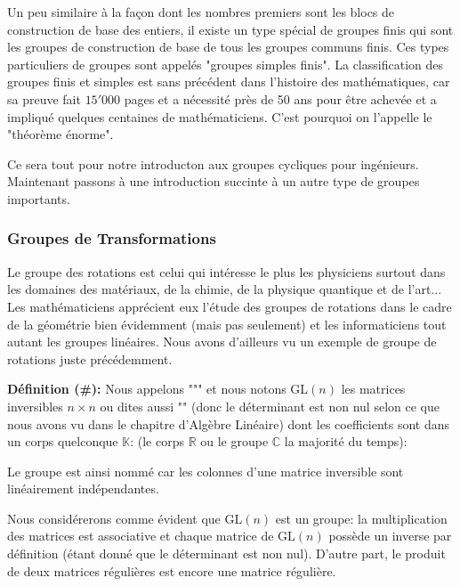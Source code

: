 	\begin{tcolorbox}[title=Remarque,colframe=black,arc=10pt]
	Un peu similaire à la façon dont les nombres premiers sont les blocs de construction de base des entiers, il existe un type spécial de groupes finis qui sont les groupes de construction de base de tous les groupes communs finis. Ces types particuliers de groupes sont appelés "groupes simples finis". La classification des groupes finis et simples est sans précédent dans l'histoire des mathématiques, car sa preuve fait $15'000$ pages et a nécessité près de 50 ans pour être achevée et a impliqué quelques centaines de mathématiciens. C'est pourquoi on l'appelle le "théorème énorme".
	\end{tcolorbox}
	
	Ce sera tout pour notre introducton aux groupes cycliques pour ingénieurs. Maintenant passons à une introduction succinte à un autre type de groupes importants.
	
	\subsubsection{Groupes de Transformations}
	Le groupe des rotations est celui qui intéresse le plus les physiciens surtout dans les domaines des matériaux, de la chimie, de la physique quantique et de l'art... Les mathématiciens apprécient eux l'étude des groupes de rotations dans le cadre de la géométrie bien évidemment (mais pas seulement) et les informaticiens tout autant les groupes linéaires. Nous avons d'ailleurs vu un exemple de groupe de rotations juste précédemment.
	
	\textbf{Définition (\#\mydef):} Nous appelons """ et nous notons $\text{GL}(n)$ les matrices inversibles $n\times n$ ou dites aussi "" (donc le déterminant est non nul selon ce que nous avons vu dans le chapitre d'Algèbre Linéaire) dont les coefficients sont dans un corps quelconque $\mathbb{K}$: (le corps $\mathbb{R}$ ou le groupe $\mathbb{C}$ la majorité du temps):
	
	Le groupe est ainsi nommé car les colonnes d'une matrice inversible sont linéairement indépendantes.
	
	Nous considérerons comme évident que $\text{GL}(n)$ est un groupe: la multiplication des matrices est associative et chaque matrice de $\text{GL}(n)$ possède un inverse par définition (étant donné que le déterminant est non nul). D'autre part, le produit de deux matrices régulières est encore une matrice régulière.
	
